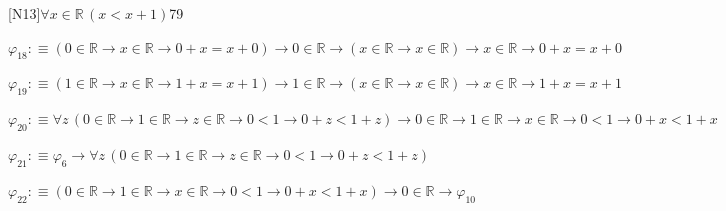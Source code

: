\begin{fullproof}{[N13]}{$\forall x \in \mathbb{R}\,(x < x + 1)$}{79}
\begin{abbrevlist}
\item $\varphi_{18} :\equiv (0 \in \mathbb{R} \to x \in \mathbb{R} \to 0 + x = x + 0) \to 0 \in \mathbb{R} \to (x \in \mathbb{R} \to x \in \mathbb{R}) \to x \in \mathbb{R} \to 0 + x = x + 0$
\item $\varphi_{19} :\equiv (1 \in \mathbb{R} \to x \in \mathbb{R} \to 1 + x = x + 1) \to 1 \in \mathbb{R} \to (x \in \mathbb{R} \to x \in \mathbb{R}) \to x \in \mathbb{R} \to 1 + x = x + 1$
\item $\varphi_{20} :\equiv \forall z\,(0 \in \mathbb{R} \to 1 \in \mathbb{R} \to z \in \mathbb{R} \to 0 < 1 \to 0 + z < 1 + z) \to 0 \in \mathbb{R} \to 1 \in \mathbb{R} \to x \in \mathbb{R} \to 0 < 1 \to 0 + x < 1 + x$
\item $\varphi_{21} :\equiv \varphi_{6} \to \forall z\,(0 \in \mathbb{R} \to 1 \in \mathbb{R} \to z \in \mathbb{R} \to 0 < 1 \to 0 + z < 1 + z)$
\item $\varphi_{22} :\equiv (0 \in \mathbb{R} \to 1 \in \mathbb{R} \to x \in \mathbb{R} \to 0 < 1 \to 0 + x < 1 + x) \to 0 \in \mathbb{R} \to \varphi_{10}$
\end{abbrevlist}
\end{fullproof}
